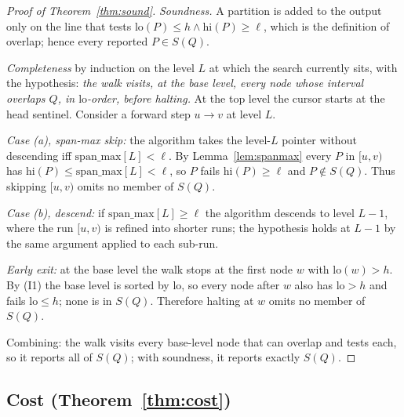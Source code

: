 \documentclass[10pt]{article}
\theoremstyle{definition}
\begin{document}
\begin{proof}[Proof of Theorem~\ref{thm:sound}]
\emph{Soundness.} A partition is added to the output only on the line that tests
$\mathrm{lo}(P)\le h \wedge \mathrm{hi}(P)\ge \ell$, which is the definition of overlap;
hence every reported $P\in S(Q)$.

\emph{Completeness} by induction on the level $L$ at which the search currently sits,
with the hypothesis: \emph{the walk visits, at the base level, every node whose interval
overlaps $Q$, in $\mathrm{lo}$-order, before halting.} At the top level the cursor starts
at the head sentinel. Consider a forward step $u\!\rightarrow\!v$ at level $L$.

\emph{Case (a), span-max skip:} the algorithm takes the level-$L$ pointer without
descending iff $\mathrm{span\_max}[L]<\ell$. By Lemma~\ref{lem:spanmax} every $P$ in
$[u,v)$ has $\mathrm{hi}(P)\le \mathrm{span\_max}[L]<\ell$, so $P$ fails
$\mathrm{hi}(P)\ge\ell$ and $P\notin S(Q)$. Thus skipping $[u,v)$ omits no member of
$S(Q)$.

\emph{Case (b), descend:} if $\mathrm{span\_max}[L]\ge\ell$ the algorithm descends to
level $L-1$, where the run $[u,v)$ is refined into shorter runs; the hypothesis holds at
$L-1$ by the same argument applied to each sub-run.

\emph{Early exit:} at the base level the walk stops at the first node $w$ with
$\mathrm{lo}(w)>h$. By (I1) the base level is sorted by $\mathrm{lo}$, so every node after
$w$ also has $\mathrm{lo}>h$ and fails $\mathrm{lo}\le h$; none is in $S(Q)$. Therefore
halting at $w$ omits no member of $S(Q)$.

Combining: the walk visits every base-level node that can overlap and tests each, so it
reports all of $S(Q)$; with soundness, it reports exactly $S(Q)$.
\end{proof}

\subsection{Cost (Theorem~\ref{thm:cost})}
\end{document}
